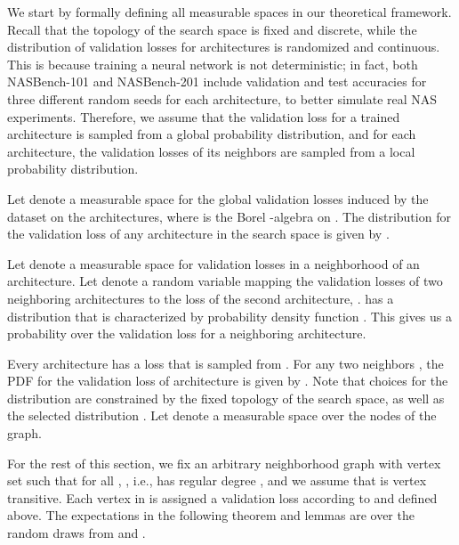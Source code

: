 \documentclass[11pt]{article}
\numberwithin{equation}{section}
\numberwithin{figure}{section}
\theoremstyle{plain}
\theoremstyle{definition}
\begin{document}
We start by formally defining all measurable spaces in our theoretical framework.
Recall that the topology of the search space is fixed and discrete, 
while the distribution of validation losses for architectures is randomized and continuous.
This is because training a neural network is not deterministic; in fact, both NASBench-101 and
NASBench-201 include validation and test accuracies for three different random seeds for each
architecture, to better simulate real NAS experiments.
Therefore, we assume that the validation loss for a trained architecture is sampled from
a global probability distribution, and for each architecture, 
the validation losses of its neighbors are sampled from a local probability distribution.

Let  denote a measurable space for the global validation losses induced by the dataset on the architectures,
where  is the Borel -algebra on . 
The distribution for the validation loss of any architecture in the search space is given by . 

Let  denote a measurable space for validation losses in a neighborhood of an architecture. Let  denote a random variable mapping the validation losses of two neighboring architectures to the loss of the second architecture, .  has a distribution that is characterized by probability density function . This gives us a probability over the validation loss for a neighboring architecture.

Every architecture  has a loss  that is sampled from . For any two neighbors , the PDF for the validation loss  of architecture  is given by .
Note that choices for the distribution  are constrained by the 
fixed topology of the search space, as well as the selected distribution .
Let  denote a measurable space over the nodes of the graph. 


For the rest of this section, we fix an arbitrary neighborhood graph
 with vertex set  such that for all , , i.e.,
 has regular degree , and we assume that  is vertex transitive.
Each vertex in  is assigned a validation loss according to
 and  defined above.
The expectations in the following theorem and lemmas are over the random
draws from  and .

\probopt*
\end{document}
